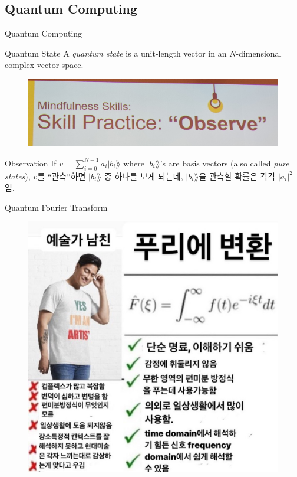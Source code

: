 \documentclass[../240513_msquare_shor.tex]{subfiles}
\begin{document}
\subsection{Quantum Computing}
\begin{frame}{Quantum Computing}
    \begin{block}{Quantum State}
        A \textit{quantum state} is a
        unit-length vector in an \(N\)-dimensional complex vector space.
    \end{block}
    \pause
    \begin{figure}
        \centering
        \includegraphics[width=.7\textwidth]{images/observe.png}
    \end{figure}
    \begin{block}{Observation}
        If \(v = \sum_{i=0}^{N-1} a_i \vert b_i \rang\)
        where \(\vert b_i \rang\)'s are basis vectors (also called \textit{pure states}),
        \(v\)를 ``관측''하면 \(\vert b_i \rang\) 중 하나를 보게 되는데,
        \(\vert b_i \rang\)을 관측할 확률은 각각 \(|a_i|^2\)임.
    \end{block}
\end{frame}

\begin{frame}{Quantum Fourier Transform}
    \begin{figure}
        \centering
        \includegraphics[width=.7\textwidth]{images/fourier.jpg}
    \end{figure}
\end{frame}
\end{document}

